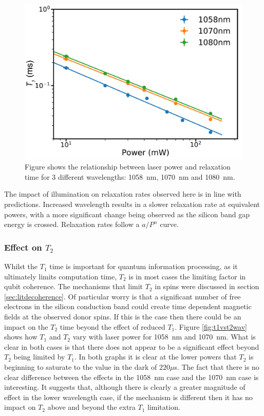 \begin{figure}
\centering
\includegraphics[width = 0.8\columnwidth]{Figures/Logwavelengthcomp.pdf}
\caption[Relaxation comparison at 8~K and 1058~nm, 1070~nm, and 1080~nm illumination]{Figure shows the relationship between laser power and relaxation time for 3 different wavelengths: 1058~nm, 1070~nm and 1080~nm.}
\label{fig:wavcomparison}
\end{figure}

The impact of illumination on relaxation rates observed here is in line with predictions.
Increased wavelength results in a slower relaxation rate at equivalent powers, with a more significant change being observed as the silicon band gap energy is crossed.
Relaxation rates follow a $a/P^{\alpha}$ curve.

\subsubsection{Effect on $T_2$}

Whilst the $T_1$ time is important for quantum information processing, as it ultimately limits computation time, $T_2$ is in most cases the limiting factor in qubit coherence.
The mechanisms that limit $T_2$ in spins were discussed in section \ref{sec:litdecoherence}.
Of particular worry is that a significant number of free electrons in the silicon conduction band could create time dependent magnetic fields at the observed donor spins. 
If this is the case then there could be an impact on the $T_2$ time beyond the effect of reduced $T_1$.
Figure \ref{fig:t1vst2wav} shows how $T_1$ and $T_2$ vary with laser power for 1058~nm and 1070~nm.
What is clear in both cases is that there does not appear to be a significant effect beyond $T_2$ being limited by $T_1$.
In both graphs it is clear at the lower powers that $T_2$ is beginning to saturate to the value in the dark of $220\mu$s.
The fact that there is no clear difference between the effects in the 1058~nm case and the 1070~nm case is interesting. 
It suggests that, although there is clearly a greater magnitude of effect in the lower wavelength case, if the mechanism is different then it has no impact on $T_2$ above and beyond the extra $T_1$ limitation.


